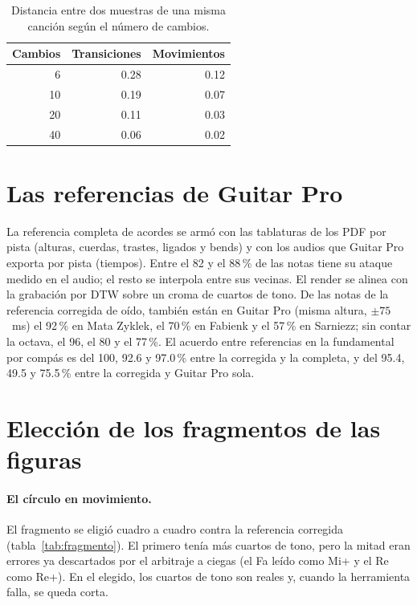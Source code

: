 \begin{table}[ht]
  \centering\small
  \caption{Distancia entre dos muestras de una misma canción según el número de cambios.}\label{tab:ruido}
  \begin{tabular}{@{}rrr@{}}
    \toprule
    Cambios & Transiciones & Movimientos \\
    \midrule
    6 & 0.28 & 0.12 \\
    10 & 0.19 & 0.07 \\
    20 & 0.11 & 0.03 \\
    40 & 0.06 & 0.02 \\
    \bottomrule
  \end{tabular}
\end{table}

\section{Las referencias de Guitar Pro}

La referencia completa de acordes se armó con las tablaturas de los PDF por pista (alturas, cuerdas, trastes, ligados y
bends) y con los audios que Guitar Pro exporta por pista (tiempos). Entre el 82 y el 88\,\% de las notas tiene su ataque
medido en el audio; el resto se interpola entre sus vecinas. El render se alinea con la grabación por DTW sobre un croma
de cuartos de tono. De las notas de la referencia corregida de oído, también están en Guitar Pro (misma altura, $\pm75$~ms)
el 92\,\% en Mata Zyklek, el 70\,\% en Fabienk y el 57\,\% en Sarniezz; sin contar la octava, el 96, el 80 y el 77\,\%. El
acuerdo entre referencias en la fundamental por compás es del 100, 92.6 y 97.0\,\% entre la corregida y la completa, y del
95.4, 49.5 y 75.5\,\% entre la corregida y Guitar Pro sola.

\section{Elección de los fragmentos de las figuras}

\paragraph{El círculo en movimiento.} El fragmento se eligió cuadro a cuadro contra la referencia corregida
(tabla~\ref{tab:fragmento}). El primero tenía más cuartos de tono, pero la mitad eran errores ya descartados por el
arbitraje a ciegas (el Fa leído como Mi+ y el Re como Re+). En el elegido, los cuartos de tono son reales y, cuando la
herramienta falla, se queda corta.

